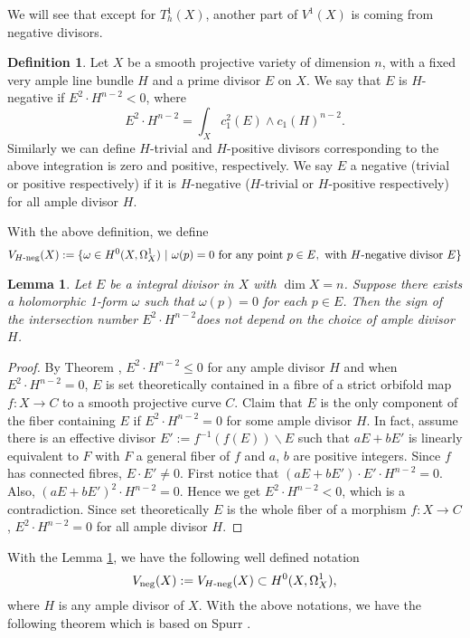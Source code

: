 \documentclass[12pt,reqno]{amsart}
\newtheorem{lemma}[theorem]{Lemma}
\theoremstyle{question}
\theoremstyle{definition}
\newtheorem{definition}[theorem]{Definition}
\theoremstyle{remark}
\theoremstyle{cited}
\theoremstyle{citeddef}
\begin{document}
We will see that except for $T_h^1(X)$, another part of $V^1(X)$ is coming from negative divisors.
\begin{definition}
Let $X$ be a smooth projective variety of dimension $n$, with a fixed very ample line bundle $H$ and a prime divisor $E$ on $X$. We say that $E$ is $H$-negative if $E^2\cdot H^{n-2}<0$, where $$E^2\cdot H^{n-2}=\int_X c_1^2(E)\wedge c_1(H)^{n-2}.$$ Similarly we can define $H$-trivial and $H$-positive divisors corresponding to the above integration is zero and positive, respectively. We say $E$ a negative (trivial or positive respectively) if it is $H$-negative ($H$-trivial or $H$-positive respectively) for all ample divisor $H$.
\end{definition}  
With the above definition, we define $$V_{H\textnormal{-neg}}(X):=\{\omega\in H^0(X, \Omega_X^1)\ |\ \omega(p)=0\  \textnormal{for any point}\ p\in E, \ \textnormal{with $H$-negative divisor}\  E\}$$  

\begin{lemma}\label{lem:welldef}
Let $E$ be a integral divisor in $X$ with $\dim X=n$. Suppose there exists a holomorphic 1-form $\omega$ such that $\omega(p)=0$ for each $p\in E$. Then the sign of the intersection number $E^2\cdot H^{n-2}$does not depend on the choice of ample divisor $H$.
\end{lemma}

\begin{proof}
By Theorem \cite[Theorem 2]{Sp88}, $E^2\cdot H^{n-2}\leq 0$ for any ample divisor $H$ and when $E^2\cdot H^{n-2}=0$, $E$ is set theoretically contained in a fibre of a strict orbifold map $f: X\to C$ to a smooth projective curve $C$.  Claim that $E$ is the only component of the fiber containing $E$ if $E^2\cdot H^{n-2}=0$ for some ample divisor $H$. In fact, assume there is an effective divisor $E':=f^{-1}(f(E))\backslash E$ such that $aE+bE'$ is linearly equivalent to $F$ with $F$ a general fiber of $f$ and $a$, $b$ are positive integers. Since $f$ has connected fibres, $E\cdot E'\not=0$.  First notice that $(aE+bE')\cdot E'\cdot H^{n-2}=0$. Also, $(aE+bE')^2\cdot H^{n-2}=0$. Hence we get $E^2\cdot H^{n-2}<0$, which is a contradiction. Since set theoretically $E$ is the whole fiber of a morphism $f: X\to C$, $E^2\cdot H^{n-2}=0$ for all ample divisor $H$. 
\end{proof}


With the Lemma \ref{lem:welldef}, we have the following well defined notation$$V_{\textnormal{neg}}(X):=V_{H\textnormal{-neg}}(X)\subset H^0(X, \Omega_X^1),$$ where $H$ is any ample divisor of $X$. With the above notations, we have the following theorem which is based on Spurr \cite[Theorem 2]{Sp88}.
\end{document}
